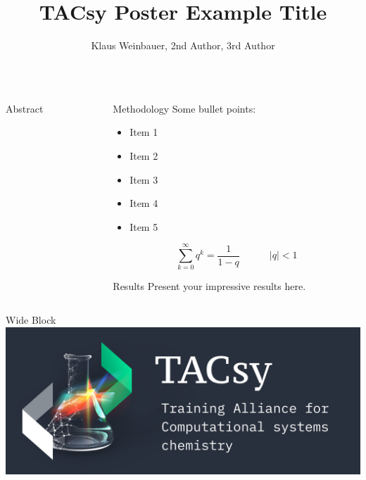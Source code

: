 \documentclass{beamer}
\title[Beamer Poster]{TACsy Poster Example Title}
\author{Klaus Weinbauer, 2nd Author, 3rd Author}
\institute{Bioinformatik, Institut für Informatik}
\begin{document}
\begin{frame}
	\vfill
	\begin{columns}[t]
		\begin{column}{.48\linewidth}
			\begin{block}{Abstract}
				\lipsum[1]
			\end{block}
		\end{column}
		\begin{column}{.48\linewidth}
			\begin{block}{Methodology}
				Some bullet points:
				\begin{itemize}
					\item Item 1
					\item Item 2
					\item Item 3
					\item Item 4
					\item Item 5
				\end{itemize}
				\begin{equation}
					\sum_{k=0}^{\infty}{q^k} = \frac{1}{1-q} \quad\quad\quad |q| < 1 
				\end{equation}
			\end{block}
			\begin{block}{Results}
				Present your impressive results here.
			\end{block}
		\end{column}
	\end{columns}
	\vfill
	\begin{columns}[t]
		\begin{column}{.98\linewidth}
			\begin{block}{Wide Block}
				\centering
				\includegraphics[width=\linewidth]{figures/tacsy_logo.jpg}
			\end{block}
		\end{column}
	\end{columns}
	\vfill
\end{frame}
\end{document}
